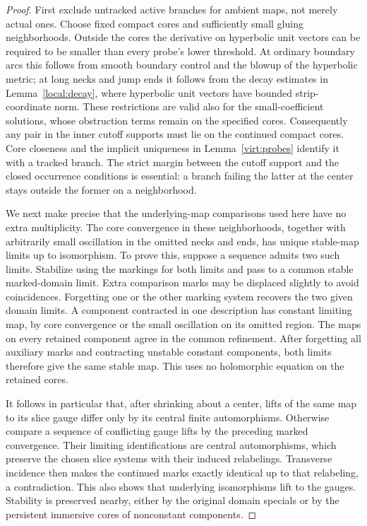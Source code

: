 \begin{proof}
First exclude untracked active branches for ambient maps, not merely
actual ones.  Choose fixed compact cores and sufficiently small gluing
neighborhoods.  Outside the cores the derivative on hyperbolic unit
vectors can be required to be smaller than every probe's lower
threshold.  At ordinary boundary arcs this follows from smooth boundary
control and the blowup of the hyperbolic metric; at long necks and jump
ends it follows from the decay estimates in Lemma~\ref{local:decay},
where hyperbolic unit vectors have bounded strip-coordinate norm.
These restrictions are valid also for the small-coefficient solutions,
whose obstruction terms remain on the specified cores.  Consequently
any pair in the inner cutoff supports must lie on the continued compact
cores.  Core closeness and the implicit uniqueness in
Lemma~\ref{virt:probes} identify it with a tracked branch.  The strict
margin between the cutoff support and the closed occurrence conditions
is essential: a branch failing the latter at the center stays outside
the former on a neighborhood.

We next make precise that the underlying-map comparisons used here have
no extra multiplicity.  The core convergence in these neighborhoods,
together with arbitrarily small oscillation in the omitted necks and
ends, has unique stable-map limits up to isomorphism.  To prove this,
suppose a sequence admits two such limits.  Stabilize using the markings
for both limits and pass to a common stable marked-domain limit.  Extra
comparison marks may be displaced slightly to avoid coincidences.
Forgetting one or the other marking system recovers the two given domain
limits.  A component contracted in one description has constant limiting
map, by core convergence or the small oscillation on its omitted region.
The maps on every retained component agree in the common refinement.
After forgetting all auxiliary marks and contracting unstable constant
components, both limits therefore give the same stable map.  This uses
no holomorphic equation on the retained cores.

It follows in particular that, after shrinking about a center, lifts of
the same map to its slice gauge differ only by its central finite
automorphisms.  Otherwise compare a sequence of conflicting gauge lifts
by the preceding marked convergence.  Their limiting identifications
are central automorphisms, which preserve the chosen slice systems with
their induced relabelings.  Transverse incidence then makes the continued
marks exactly identical up to that relabeling, a contradiction.  This
also shows that underlying isomorphisms lift to the gauges.  Stability is
preserved nearby, either by the original domain specials or by the
persistent immersive cores of nonconstant components.


\end{proof}
